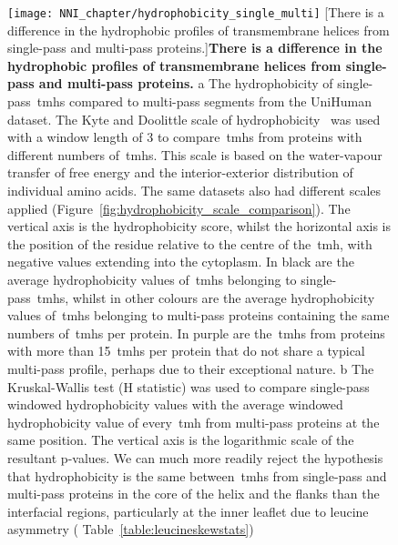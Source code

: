 \begin{figure}[!ht]
\centering
\texttt{[image: NNI\_chapter/hydrophobicity\_single\_multi]}
[There is a difference in the hydrophobic profiles of transmembrane helices from single\--pass and multi\--pass proteins.]{\textbf{There is a difference in the hydrophobic profiles of transmembrane helices from single\--pass and multi\--pass proteins.}
 a The hydrophobicity of single\--pass~\gls{tmh}s compared to multi\--pass segments from the UniHuman dataset.
The Kyte and Doolittle scale of hydrophobicity~\cite{Kyte1982} was used with a window length of 3 to compare~\gls{tmh}s from proteins with different numbers of~\gls{tmh}s.
This scale is based on the water-vapour transfer of free energy and the interior-exterior distribution of individual amino acids.
The same datasets also had different scales applied (Figure~\ref{fig:hydrophobicity_scale_comparison}).
The vertical axis is the hydrophobicity score, whilst the horizontal axis is the position of the residue relative to the centre of the~\gls{tmh}, with negative values extending into the cytoplasm.
In black are the average hydrophobicity values of~\gls{tmh}s belonging to single\--pass~\gls{tmh}s, whilst in other colours are the average hydrophobicity values of~\gls{tmh}s belonging to multi\--pass proteins containing the same numbers of~\gls{tmh}s per protein.
In purple are the~\gls{tmh}s from proteins with more than 15~\gls{tmh}s per protein that do not share a typical multi\--pass profile, perhaps due to their exceptional nature.
b The Kruskal-Wallis test (H statistic) was used to compare single\--pass windowed hydrophobicity values with the average windowed hydrophobicity value of every~\gls{tmh} from multi\--pass proteins at the same position.
The vertical axis is the logarithmic scale of the resultant p\--values.
We can much more readily reject the hypothesis that hydrophobicity is the same between~\gls{tmh}s from single\--pass and multi\--pass proteins in the core of the helix and the flanks than the interfacial regions, particularly at the inner leaflet due to leucine asymmetry ( Table~\ref{table:leucineskewstats})}

\label{fig:hydrophobicity_single_multi}
\end{figure}

